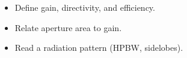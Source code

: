 \begin{objectives}
\begin{itemize}[leftmargin=1.4em,itemsep=2pt]
\item Define gain, directivity, and efficiency.
\item Relate aperture area to gain.
\item Read a radiation pattern (HPBW, sidelobes).
\end{itemize}
\end{objectives}
